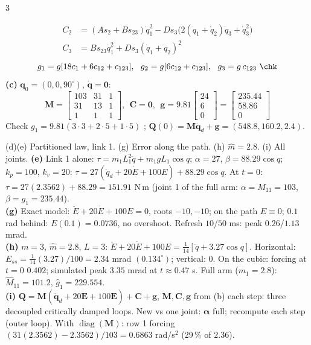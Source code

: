 \begin{multicols}{3}
\begin{examq}
\[\begin{aligned}
C_2&=(As_2+Bs_{23})\dot q_1^2-Ds_3\big(2(\dot q_1{+}\dot q_2)\dot q_3+\dot q_3^2\big)\\ C_3&=Bs_{23}\dot q_1^2+Ds_3(\dot q_1+\dot q_2)^2
\end{aligned}\]
\[g_1=g[18c_1+6c_{12}+c_{123}],\ \ g_2=g[6c_{12}+c_{123}],\ \ g_3=g\,c_{123}\ \chk\]
\textbf{(c)} $\mathbf q_0=(0,0,90^\circ)$, $\dot{\mathbf q}=\mathbf 0$:
\[\mathbf M=\begin{bmatrix}103&31&1\\31&13&1\\1&1&1\end{bmatrix},\ \ \mathbf C=\mathbf 0,\ \ \mathbf g=9.81\begin{bmatrix}24\\6\\0\end{bmatrix}=\begin{bmatrix}235.44\\58.86\\0\end{bmatrix}\]
Check $g_1=9.81(3\cdot3+2\cdot5+1\cdot5)$ \checkmark; $\mathbf Q(0)=\mathbf M\ddot{\mathbf q}_d+\mathbf g=(548.8,160.2,2.4)$. \chk
\end{examq}
\begin{examq}
(d)(e) Partitioned law, link 1. (g) Error along the path. (h) $\hat m=2.8$. (i) All joints.
\solution
\textbf{(e)} Link 1 alone: $\tau=m_1L_1^2\ddot q+m_1gL_1\cos q$; $\alpha=27$, $\beta=88.29\cos q$; $k_p=100$, $k_v=20$: $\tau=27(\ddot q_d+20\dot E+100E)+88.29\cos q$. At $t=0$: $\tau=27(2.3562)+88.29=151.91$ N\,m (joint 1 of the full arm: $\alpha=M_{11}=103$, $\beta=g_1=235.44$). \chk\\
\textbf{(g)} Exact model: $\ddot E+20\dot E+100E=0$, roots $-10,-10$; on the path $E\equiv0$; $0.1$ rad behind: $E(0.1)=0.0736$, no overshoot. Refresh $10$/$50$ ms: peak $0.26$/$1.13$ mrad. \chk\\
\textbf{(h)} $m=3$, $\hat m=2.8$, $L=3$: $\ddot E+20\dot E+100E=\tfrac1{14}[\ddot q+3.27\cos q]$. Horizontal: $E_{ss}=\tfrac1{14}(3.27)/100=2.34$ mrad $(0.134^\circ)$; vertical: $0$. On the cubic: forcing at $t=0$ $0.402$; simulated peak $3.35$ mrad at $t\approx0.47$ s. Full arm ($m_1=2.8$): $\hat M_{11}=101.2$, $\hat g_1=229.554$. \chk\\
\textbf{(i)} $\mathbf Q=\mathbf M(\ddot{\mathbf q}_d+20\dot{\mathbf E}+100\mathbf E)+\mathbf C+\mathbf g$, $\mathbf M,\mathbf C,\mathbf g$ from (b) each step: three decoupled critically damped loops. New vs one joint: $\boldsymbol\alpha$ full; recompute each step (outer loop). With $\operatorname{diag}(\mathbf M)$: row 1 forcing $(31(2.3562)-2.3562)/103=0.6863$ rad/s$^2$ (29\,\% of $2.36$). \chk

\end{examq}
\end{multicols}
